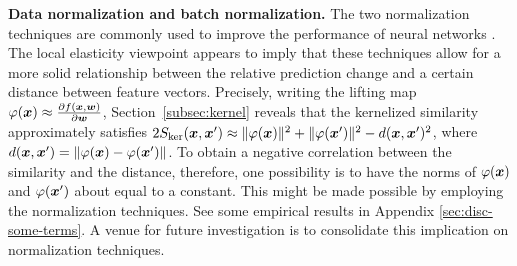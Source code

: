 {\bf Data normalization and batch normalization.} The two normalization techniques are commonly used to improve the performance of neural networks \citep{gonzalez2002digital,ioffe2015batch}. The local elasticity viewpoint appears to imply that these techniques allow for a more solid relationship between the relative prediction change and a certain distance between feature vectors. Precisely, writing the lifting map $\varphi(\bm{x}) \approx \frac{\partial f(\bm{x}, \bm{w})}{\partial \bm{w}}$, Section~\ref{subsec:kernel} reveals that the kernelized similarity approximately satisfies $2S_{\mathrm{ker}}(\bm{x}, \bm{x}') \approx \|\varphi(\bm{x})\|^2 + \|\varphi(\bm{x}')\|^2 - d(\bm{x}, \bm{x}')^2$, where $d(\bm{x}, \bm{x}') = \|\varphi(\bm{x}) - \varphi(\bm{x}')\|$. To obtain a negative correlation between the similarity and the distance, therefore, one possibility is to have the norms of $\varphi(\bm{x})$ and $\varphi(\bm{x}')$ about equal to a constant. This might be made possible by employing the normalization techniques. See some empirical results in Appendix \ref{sec:disc-some-terms}. A venue for future investigation is to consolidate this implication on normalization techniques.


